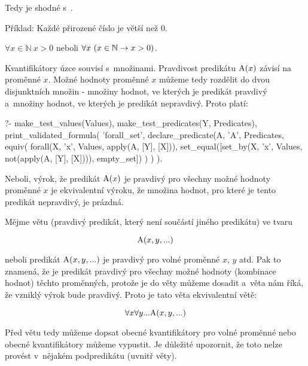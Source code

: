 Tedy  je shodné s~.

Příklad: Každé přirozené číslo je větší než 0. 

\(\forall x \in \mathbb{N} \ x > 0\) neboli \(\forall x \ (x \in \mathbb{N} \rightarrow x > 0)\).

Kvantifikátory úzce souvisí s~množinami. Pravdivost predikátu \(\mathrm{A}(x)\) závisí na proměnné \(x\). Možné hodnoty
proměnné \(x\) můžeme tedy rozdělit do dvou disjunktních množin - množiny hodnot, ve kterých je predikát pravdivý a~množiny hodnot, ve kterých je predikát nepravdivý. Proto platí:

\begin{prolog}
?- 	make_test_values(Values),
	make_test_predicates(Y, Predicates),
	print_validated_formula(
		'forall_set',
		declare_predicate(A, 'A', Predicates,
			equiv(
				forall(X, 'x', Values, apply(A, [Y], [X])),
				set_equal([set_by(X, 'x', Values, not(apply(A, [Y], [X]))), empty_set])
			)
		)
	).
\end{prolog}

Neboli, výrok, že predikát \(\mathrm{A}(x)\) je pravdivý pro všechny možné hodnoty proměnné \(x\) je ekvivalentní výroku, že množina hodnot, pro které je tento predikát nepravdivý, je prázdná.

Mějme větu (pravdivý predikát, který není součástí jiného predikátu) ve tvaru

\begin{equation}
\mathrm{A}(x, y, ...)
\end{equation}

neboli predikát \(\mathrm{A}(x, y, ...)\) je pravdivý pro volné proměnné \(x\), \(y\) atd. Pak to znamená,
že je predikát pravdivý pro všechny možné hodnoty (kombinace hodnot) těchto proměnných, protože je do věty můžeme dosadit a~věta nám říká, že vzniklý výrok bude pravdivý. Proto je tato věta ekvivalentní větě:

\begin{equation}
\forall x \forall y ... \mathrm{A}(x, y, ...)
\end{equation}

Před větu tedy můžeme dopsat obecné kvantifikátory pro volné proměnné nebo  obecné kvantifikátory můžeme vypustit. Je důležité upozornit, že toto nelze provést v~nějakém podpredikátu (uvnitř věty).

